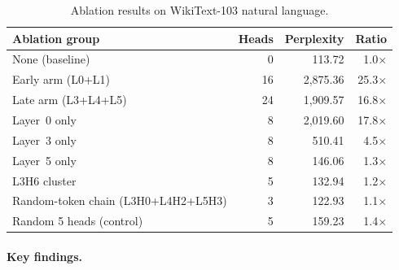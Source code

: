 \documentclass[11pt,a4paper]{article}
\begin{document}
\begin{table}[h]
\centering
\begin{tabular}{lrrr}
\toprule
Ablation group & Heads & Perplexity & Ratio \\
\midrule
None (baseline) & 0 & 113.72 & 1.0$\times$ \\
Early arm (L0+L1) & 16 & 2{,}875.36 & 25.3$\times$ \\
Late arm (L3+L4+L5) & 24 & 1{,}909.57 & 16.8$\times$ \\
Layer~0 only & 8 & 2{,}019.60 & 17.8$\times$ \\
Layer~3 only & 8 & 510.41 & 4.5$\times$ \\
Layer~5 only & 8 & 146.06 & 1.3$\times$ \\
L3H6 cluster & 5 & 132.94 & 1.2$\times$ \\
Random-token chain (L3H0+L4H2+L5H3) & 3 & 122.93 & 1.1$\times$ \\
Random 5 heads (control) & 5 & 159.23 & 1.4$\times$ \\
\bottomrule
\end{tabular}
\caption{Ablation results on WikiText-103 natural language.}
\label{tab:ablation-natural}
\end{table}

\paragraph{Key findings.}
\end{document}

